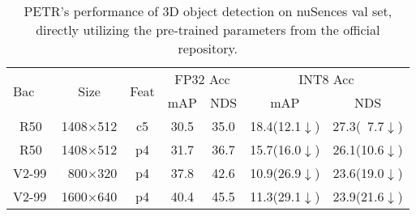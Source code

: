 \begin{table}[htb] %
    \footnotesize
    \setlength{\tabcolsep}{1.4mm}
    \centering
    \begin{tabular}{l|c|c|c|c|c|c}
    \toprule[1.5pt]
    \multirow{2}{*}{Bac} & \multirow{2}{*}{Size} & \multirow{2}{*}{Feat} & \multicolumn{2}{c|}{FP32 Acc}                               & \multicolumn{2}{c}{INT8 Acc}   \\ \cline{4-7}
     & & & \multicolumn{1}{c|}{mAP} & \multicolumn{1}{c|}{NDS} & \multicolumn{1}{c|}{mAP} & \multicolumn{1}{c}{NDS} \\ 
    \midrule
    \textcolor{white}{0}R50\textcolor{white}{0} & 1408$\times$512 & c5 & 30.5 & 35.0 & 18.4(12.1$\downarrow$) & 27.3(\textcolor{white}{0}7.7$\downarrow$) \\
    \textcolor{white}{0}R50\textcolor{white}{0} & 1408$\times$512 & p4 & 31.7 & 36.7 & 15.7(16.0$\downarrow$) & 26.1(10.6$\downarrow$) \\
    V2-99 & \textcolor{white}{0}800$\times$320 & p4 & 37.8 & 42.6 & 10.9(26.9$\downarrow$) & 23.6(19.0$\downarrow$) \\
    V2-99 & 1600$\times$640 & p4 & 40.4 & 45.5 & 11.3(29.1$\downarrow$) & 23.9(21.6$\downarrow$) \\
    \bottomrule[1.5pt]
    \end{tabular}
    \vspace{-0.3cm}
    \caption{
    PETR's performance of 3D object detection on nuSences val set, directly utilizing the pre-trained parameters from the official repository.
    }
    \label{tab:performance_drop_for_ptq_on_raw_petr}
\end{table}

\iffalse
Enlightened by the existing state-of-the-art post-training quantization methods~\cite{dong2019hawq1,dong2020hawq2,hubara2021adaq,li2021brecq,liu2021ptqvit,nagel2020up,yao2021hawq3}, the adaptive rounding proxy objective is introduced to measure the quantization performance degradation:
\begin{equation}
\begin{aligned}
    \label{eqnAdaptiveEll}
    \textstyle
    \ell(\widetilde W)
    &=\mathbf{E}_x\left[ \Vert{ (W- \widetilde W) x \Vert}^2 \right] \\
    &=tr\left( (W - \widetilde W) H (W - \widetilde W)^T \right)
\end{aligned}
\end{equation}
Where $W$ is the float weight tensor of a learnable operator, $\widetilde W$ are the quantized weight, 
$x$ is an input tensor sampled randomly from a calibration set, 
and $H$ is the second moment matrix of these vectors, interpreted as a proxy Hessian.
\fi

